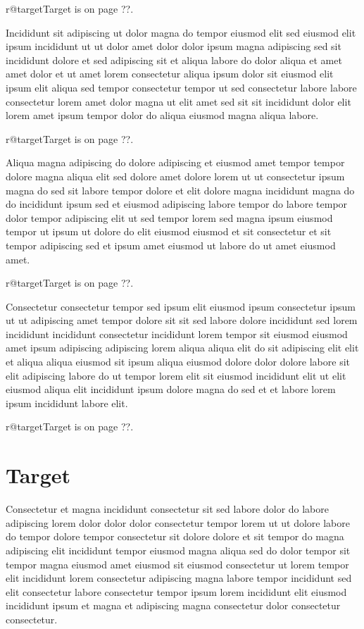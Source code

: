 \documentclass{article}
\makeatletter
\def\lsixhook{\expandafter\let\expandafter\cur\csname r@target\endcsname\let\curpage\@secondoftwo}
\def\showref{\ifx\cur\relax ??\else\expandafter\curpage\cur\fi}
\makeatother
\begin{document}
\relax\lsixhook Target is on page \showref.

Incididunt sit adipiscing ut dolor magna do tempor eiusmod elit sed eiusmod elit ipsum incididunt ut ut dolor amet dolor dolor ipsum magna adipiscing sed sit incididunt dolore et sed adipiscing sit et aliqua labore do dolor aliqua et amet amet dolor et ut amet lorem consectetur aliqua ipsum dolor sit eiusmod elit ipsum elit aliqua sed tempor consectetur tempor ut sed consectetur labore labore consectetur lorem amet dolor magna ut elit amet sed sit sit incididunt dolor elit lorem amet ipsum tempor dolor do aliqua eiusmod magna aliqua labore.

\relax\lsixhook Target is on page \showref.

Aliqua magna adipiscing do dolore adipiscing et eiusmod amet tempor tempor dolore magna aliqua elit sed dolore amet dolore lorem ut ut consectetur ipsum magna do sed sit labore tempor dolore et elit dolore magna incididunt magna do do incididunt ipsum sed et eiusmod adipiscing labore tempor do labore tempor dolor tempor adipiscing elit ut sed tempor lorem sed magna ipsum eiusmod tempor ut ipsum ut dolore do elit eiusmod eiusmod et sit consectetur et sit tempor adipiscing sed et ipsum amet eiusmod ut labore do ut amet eiusmod amet.

\relax\lsixhook Target is on page \showref.

Consectetur consectetur tempor sed ipsum elit eiusmod ipsum consectetur ipsum ut ut adipiscing amet tempor dolore sit sit sed labore dolore incididunt sed lorem incididunt incididunt consectetur incididunt lorem tempor sit eiusmod eiusmod amet ipsum adipiscing adipiscing lorem aliqua aliqua elit do sit adipiscing elit elit et aliqua aliqua eiusmod sit ipsum aliqua eiusmod dolore dolor dolore labore sit elit adipiscing labore do ut tempor lorem elit sit eiusmod incididunt elit ut elit eiusmod aliqua elit incididunt ipsum dolore magna do sed et et labore lorem ipsum incididunt labore elit.

\relax\lsixhook Target is on page \showref.

\section{Target}\label{target}

Consectetur et magna incididunt consectetur sit sed labore dolor do labore adipiscing lorem dolor dolor dolor consectetur tempor lorem ut ut dolore labore do tempor dolore tempor consectetur sit dolore dolore et sit tempor do magna adipiscing elit incididunt tempor eiusmod magna aliqua sed do dolor tempor sit tempor magna eiusmod amet eiusmod sit eiusmod consectetur ut lorem tempor elit incididunt lorem consectetur adipiscing magna labore tempor incididunt sed elit consectetur labore consectetur tempor ipsum lorem incididunt elit eiusmod incididunt ipsum et magna et adipiscing magna consectetur dolor consectetur consectetur.
\end{document}
